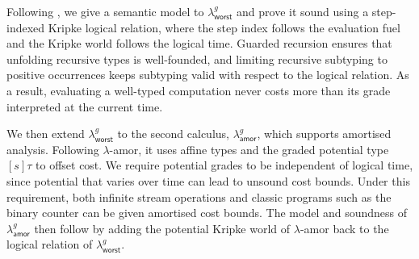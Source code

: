 Following \cite{rajaniUnifyingTypetheoryHigherorder2021a}, we give a semantic model to $\lambda^g_{\mathsf{worst}}$
and prove it sound using a step-indexed Kripke logical relation, where the step index follows the evaluation fuel and the
Kripke world follows the logical time. Guarded recursion ensures that unfolding recursive types is well-founded, and limiting
recursive subtyping to positive occurrences keeps subtyping valid with respect to the logical relation. As a result, evaluating
a well-typed computation never costs more than its grade interpreted at the current time.

We then extend $\lambda^g_{\mathsf{worst}}$ to the second calculus, $\lambda^g_{\mathsf{amor}}$, which supports amortised
analysis. Following $\lambda$-amor, it uses affine types and the graded potential type $[s]\tau$ to offset cost.
We require potential grades to be independent of logical time, since potential that varies over time can lead to unsound cost
bounds. Under this requirement, both infinite stream operations and classic programs such as the binary counter can be given
amortised cost bounds. The model and soundness of $\lambda^g_{\mathsf{amor}}$ then follow by adding the potential Kripke world of
$\lambda$-amor back to the logical relation of $\lambda^g_{\mathsf{worst}}$.